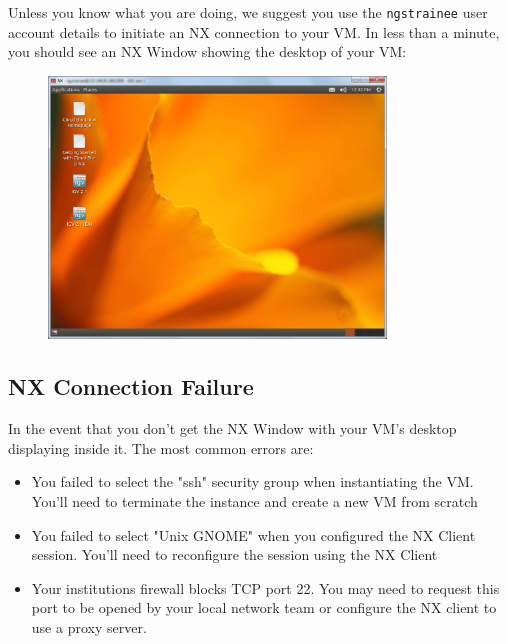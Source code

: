 Unless you know what you are doing, we suggest you use the \texttt{ngstrainee}
user account details to initiate an NX connection to your VM. In less than a
minute, you should see an NX Window showing the desktop of your VM:
\begin{figure}[H]
  \centering
  \includegraphics[width=0.8\textwidth]{post-workshop/nx_client/connected.png}
  \caption{\label{fig:nx_connected}}
\end{figure}

\subsection{NX Connection Failure}
In the event that you don't get the NX Window with your VM's desktop displaying
inside it. The most common errors are:
\begin{itemize}
\item You failed to select the "ssh" security group when instantiating the VM.
You'll need to terminate the instance and create a new VM from scratch
\item You failed to select "Unix GNOME" when you configured the NX Client
session. You'll need to reconfigure the session using the NX Client
\item Your institutions firewall blocks TCP port 22. You may need to request this
port to be opened by your local network team or configure the NX client to use a
proxy server.
\end{itemize}

